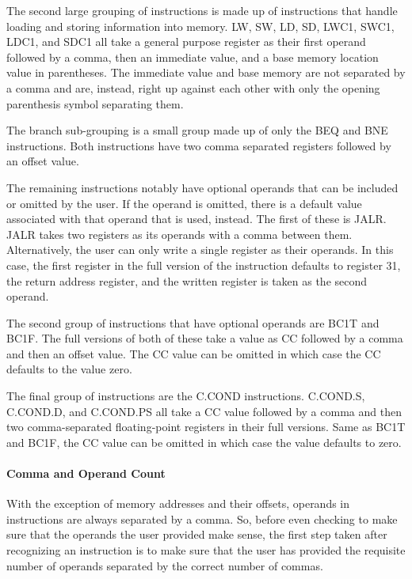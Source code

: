 \documentclass[
    parskip=half,
    fontsize=12pt,
    titlepage=firstiscover,
    toc=bibliography,
    numbers=endperiod
]{scrartcl}
\begin{document}
The second large grouping of instructions is made up of instructions
that handle loading and storing information into memory. LW, SW, LD, SD,
LWC1, SWC1, LDC1, and SDC1 all take a general purpose register as their
first operand followed by a comma, then an immediate value, and a base
memory location value in parentheses. The immediate value and base
memory are not separated by a comma and are, instead, right up against
each other with only the opening parenthesis symbol separating them.

The branch sub-grouping is a small group made up of only the BEQ and BNE
instructions. Both instructions have two comma separated registers
followed by an offset value.

The remaining instructions notably have optional operands that can be
included or omitted by the user. If the operand is omitted, there is a
default value associated with that operand that is used, instead. The
first of these is JALR. JALR takes two registers as its operands with a
comma between them. Alternatively, the user can only write a single
register as their operands. In this case, the first register in the full
version of the instruction defaults to register 31, the return address
register, and the written register is taken as the second operand.

The second group of instructions that have optional operands are BC1T
and BC1F. The full versions of both of these take a value as CC followed
by a comma and then an offset value. The CC value can be omitted in
which case the CC defaults to the value zero.

The final group of instructions are the C.COND instructions. C.COND.S,
C.COND.D, and C.COND.PS all take a CC value followed by a comma and then
two comma-separated floating-point registers in their full versions.
Same as BC1T and BC1F, the CC value can be omitted in which case the
value defaults to zero.

\paragraph{Comma and Operand Count}

With the exception of memory addresses and their offsets, operands in
instructions are always separated by a comma. So, before even checking
to make sure that the operands the user provided make sense, the first
step taken after recognizing an instruction is to make sure that the
user has provided the requisite number of operands separated by the
correct number of commas.
\end{document}
